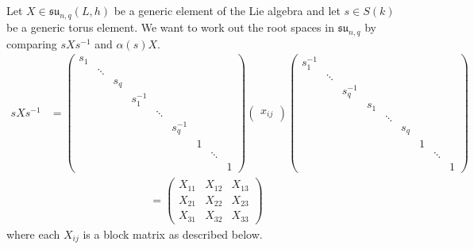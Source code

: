 \documentclass[12pt]{article}
\theoremstyle{definition}
\newcommand{\inv}{^{-1}}
\newcommand{\fraksu}{\mathfrak{su}}
\begin{document}
Let $X \in \fraksu_{n,q}(L,h)$ be a generic element of the Lie algebra and let $s \in S(k)$ be a generic torus element. We want to work out the root spaces in $\fraksu_{n,q}$ by comparing $sXs \inv$ and $\alpha(s) X$.
\begin{align*}
	sXs \inv &=
	\begin{pmatrix}
		s_1 \\
		& \ddots \\
		&& s_q \\
		&&& s_1 \inv \\
		&&&& \ddots \\
		&&&&& s_q \inv \\
		&&&&&& 1 \\
		&&&&&&& \ddots \\
		&&&&&&&& 1
	\end{pmatrix}
	\begin{pmatrix}
		x_{ij}
	\end{pmatrix}
	\begin{pmatrix}
		s_1 \inv \\
		& \ddots \\
		&& s_q \inv \\
		&&& s_1 \\
		&&&& \ddots \\
		&&&&& s_q  \\
		&&&&&& 1 \\
		&&&&&&& \ddots \\
		&&&&&&&& 1
	\end{pmatrix}
\end{align*}
\begin{align*}
	= 
	\begin{pmatrix}
		X_{11} & X_{12} & X_{13} \\
		X_{21} & X_{22} & X_{23} \\
		X_{31} & X_{32} & X_{33}
	\end{pmatrix}
\end{align*}
where each $X_{ij}$ is a block matrix as described below.
\end{document}
